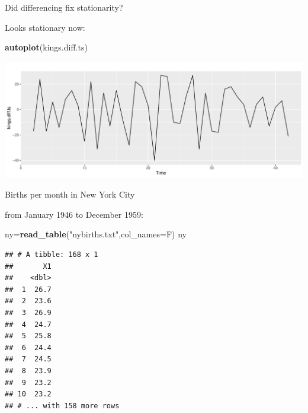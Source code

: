 \documentclass[
  ignorenonframetext,
]{beamer}
\newenvironment{Shaded}{\begin{snugshade}}{\end{snugshade}}
\newcommand{\DataTypeTok}[1]{\textcolor[rgb]{0.13,0.29,0.53}{#1}}
\newcommand{\KeywordTok}[1]{\textcolor[rgb]{0.13,0.29,0.53}{\textbf{#1}}}
\newcommand{\NormalTok}[1]{#1}
\newcommand{\StringTok}[1]{\textcolor[rgb]{0.31,0.60,0.02}{#1}}
\begin{document}
\begin{frame}[fragile]{Did differencing fix stationarity?}
\protect\hypertarget{did-differencing-fix-stationarity}{}

Looks stationary now:

\begin{Shaded}
\begin{Highlighting}[]
\KeywordTok{autoplot}\NormalTok{(kings.diff.ts)}
\end{Highlighting}
\end{Shaded}

\includegraphics{slides_d29_files/figure-beamer/Differenced-Kings-Series-1.pdf}

\end{frame}

\begin{frame}[fragile]{Births per month in New York City}
\protect\hypertarget{births-per-month-in-new-york-city}{}

from January 1946 to December 1959:

\small

\begin{Shaded}
\begin{Highlighting}[]
\NormalTok{ny=}\KeywordTok{read_table}\NormalTok{(}\StringTok{"nybirths.txt"}\NormalTok{,}\DataTypeTok{col_names=}\NormalTok{F)}
\NormalTok{ny}
\end{Highlighting}
\end{Shaded}

\begin{verbatim}
## # A tibble: 168 x 1
##       X1
##    <dbl>
##  1  26.7
##  2  23.6
##  3  26.9
##  4  24.7
##  5  25.8
##  6  24.4
##  7  24.5
##  8  23.9
##  9  23.2
## 10  23.2
## # ... with 158 more rows
\end{verbatim}

\normalsize

\end{frame}
\end{document}

